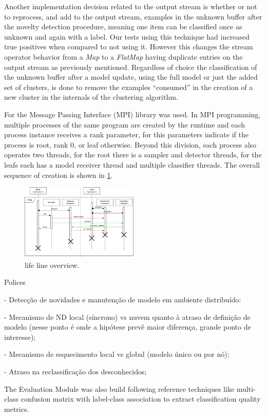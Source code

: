 Another implementation decision related to the output stream is whether or not
to reprocess, and add to the output stream, examples in the unknown buffer after
the novelty detection procedure, meaning one item can be classified once as
unknown and again with a label.
Our tests using this technique had increased true positives when compared to
not using it.
However this changes the stream operator behavior from a \textit{Map} to a
\textit{FlatMap} having duplicate entries on the output stream as previously
mentioned.
Regardless of choice the classification of the unknown buffer after a model
update, using the full model or just the added set of clusters, is done to
remove the examples ``consumed'' in the creation of a new cluster in the internals
of the clustering algorithm.


For \mfog the Message Passing Interface (MPI) library was used.
In MPI programming, multiple processes of the same program are created by the
runtime and each process instance receives a rank parameter, for \mfog this
parameters indicate if the process is root, rank $0$, or leaf otherwise.
Beyond this division, each process also operates two threads, for the root
there is a sampler and detector threads, for the leafs each has a model receiver
thread and multiple classifier threads.
The overall sequence of creation is shown in \ref{fig:mfog-mpi-life}.

\begin{figure}[htb]
  \centerline{\includegraphics[width=0.5\textwidth]{figures/mfog-arch-mpi.png}}
  \caption{\mfog life line overview.}
  \label{fig:mfog-mpi-life}
\end{figure}

\begin{highlight}
Polices

- Detecção de novidades e manutenção de modelo em ambiente distribuído:

  - Mecanismo de ND local (síncrono) vs nuvem quanto à atraso de definição de modelo
    (nesse ponto é onde a hipótese prevê maior diferença, grande ponto de interesse);

  - Mecanismo de esquecimento local vs global (modelo único ou por nó);

  - Atraso na reclassificação dos desconhecidos;
\end{highlight}

The Evaluation Module was also build following reference techniques like
multi-class confusion matrix with label-class association
\cite{Faria2016minas}
to extract classification quality metrics.
